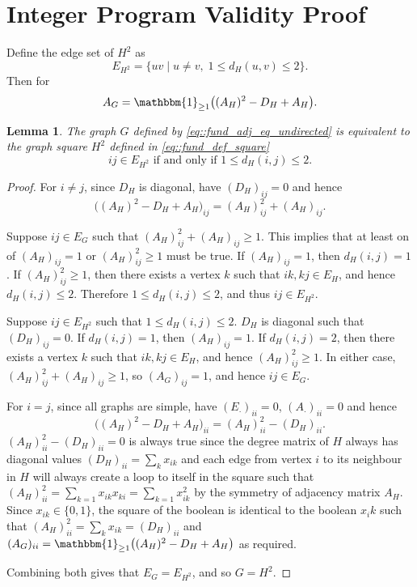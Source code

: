 \documentclass[11pt]{article}
\newtheorem{lemma}{Lemma}
\begin{document}
\newpage

\section{Integer Program Validity Proof} \label{sec::integer_program_validity_proof}
Define the edge set of $H^2$ as 
\begin{equation} \label{eq::fund_def_square}
E_{H^2} = \{ uv \mid u \neq v,\; 1 \leq d_H(u,v) \leq 2 \}.
\end{equation}
Then for 
\begin{equation} \label{eq::fund_adj_eq_undirected}
A_G = \mathbbm{1}_{\geq 1}\big((A_H)^2 - D_H + A_H\big).
\end{equation}
\begin{lemma} \label{lemma::G_equal_to_H^2}
  The graph $G$ defined by \eqref{eq::fund_adj_eq_undirected} is equivalent to the graph square $H^2$ defined in \eqref{eq::fund_def_square} 
  \begin{equation} \label{eq::fund_def_square_expanded}
    ij \in E_{H^2} \text{ if and only if } 1 \leq d_H(i,j) \leq 2. 
  \end{equation}
\end{lemma}
\begin{proof} 
  \noindent
  For $i \neq j$, since $D_H$ is diagonal, have $(D_H)_{ij} = 0$ and hence
  \[
  \big((A_H)^2 - D_H + A_H\big)_{ij} = (A_H)^2_{ij} + (A_H)_{ij}.
  \]

  Suppose $ij \in E_G$ such that $(A_H)^2_{ij} + (A_H)_{ij} \geq 1$. This implies that at least on of $(A_H)_{ij} = 1$ or $(A_H)^2_{ij} \geq 1$ must be true. If $(A_H)_{ij} = 1$, then $d_H(i,j) = 1$.  If $(A_H)^2_{ij} \geq 1$, then there exists a vertex $k$ such that $ik, kj \in E_H$, and hence $d_H(i,j) \leq 2$. Therefore $1 \leq d_H(i,j) \leq 2$, and thus $ij \in E_{H^2}$.

  Suppose $ij \in E_{H^2}$ such that $1 \leq d_H(i,j) \leq 2$. $D_H$ is diagonal such that $(D_H)_{ij} = 0$. If $d_H(i,j) = 1$, then $(A_H)_{ij} = 1$. If $d_H(i,j) = 2$, then there exists a vertex $k$ such that $ik, kj \in E_H$, and hence $(A_H)^2_{ij} \geq 1$. In either case, $(A_H)^2_{ij} + (A_H)_{ij} \geq 1$, so $(A_G)_{ij} = 1$, and hence $ij \in E_G$.

  For $i = j$, since all graphs are simple, have $(E_{\cdot})_{ii} = 0$, $(A_{\cdot})_{ii} = 0$ and hence
  \[
  \big((A_H)^2 - D_H + A_H\big)_{ii} = (A_H)^2_{ii} - (D_H)_{ii}.
  \]
  $(A_H)^2_{ii} - (D_H)_{ii} = 0$ is always true since the degree matrix of $H$ always has diagonal values $\displaystyle (D_H)_{ii} = \sum_k x_{ik}$ and each edge from vertex $i$ to its neighbour in $H$ will always create a loop to itself in the square such that $\displaystyle (A_H)^2_{ii} = 
  \sum_{k = 1} x_{ik}x_{ki} = \sum_{k = 1} x_{ik}^2$ by the symmetry of adjacency matrix $A_H$. Since $x_{ik} \in \{0, 1\}$, the square of the boolean is identical to the boolean $x_ik$ such that $\displaystyle (A_H)^2_{ii} = \sum_k x_{ik} = (D_H)_{ii}$ and $(A_G)_{ii} = \mathbbm{1}_{\geq 1}\big((A_H)^2 - D_H + A_H\big)$ as required. 

  Combining both gives that $E_G = E_{H^2}$, and so $G = H^2$.  
\end{proof}
\end{document}
